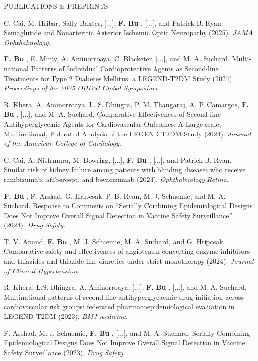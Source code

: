 \documentclass{resume} %
\newcommand{\thisYear}[1]{
	#1
}
\newcommand{\myName}[1]{
	\textbf{#1}
}
\begin{document}
\begin{rSection}{PUBLICATIONS \& PREPRINTS}
\smallskip 

C. Cai, M. Hribar, Sally Baxter, [...],  \myName{F. Bu}, [...], and Patrick B. Ryan. 
Semaglutide and Nonarteritic Anterior Ischemic Optic Neuropathy (2025). \emph{JAMA Ophthalmology}.  

\smallskip

\myName{F. Bu}, E. Minty, A. Aminorroaya, C. Blacketer, [...], and M. A. Suchard. 
Multi-national Patterns of Individual Cardioprotective Agents as Second-line Treatments for Type 2 Diabetes Mellitus: a LEGEND-T2DM Study (2024). \emph{Proceedings of the 2025 OHDSI Global Symposium.}

\thisYear{
R. Khera, A. Aminorroaya, L. S. Dhingra, P. M.  Thangaraj, A. P. Camargos, \myName{F. Bu}, [...], and M. A. Suchard. Comparative Effectiveness of Second-line Antihyperglycemic Agents for Cardiovascular Outcomes: A Large-scale, Multinational, Federated Analysis of the LEGEND-T2DM Study (2024). \emph{Journal of the American College of Cardiology}. 
}

\smallskip 

C. Cai, A. Nishimura, M. Bowring, [...], \myName{F. Bu}, [...], and Patrick B. Ryan. Similar risk of kidney failure among patients with blinding diseases who receive ranibizumab, aflibercept, and bevacizumab (2024). \emph{Ophthalmology Retina}.

\smallskip 

\myName{F. Bu}, F. Arshad, G. Hripcsak, P. B. Ryan, M. J. Schuemie, and M. A. Suchard. Response to Comments on ``Serially Combining Epidemiological Designs Does Not Improve Overall Signal Detection in Vaccine Safety Surveillance'' (2024). \emph{Drug Safety}. 

\smallskip 

T. V. Anand, \myName{F. Bu}, M. J. Schuemie, M. A. Suchard, and G. Hripcsak. Comparative safety and effectiveness of angiotensin converting enzyme inhibitors and thiazides and thiazide-like diuretics under strict monotherapy (2024).  \emph{Journal of Clinical Hypertension}.

\smallskip 

R. Khera, L.S. Dhingra, A. Aminorroaya, [...], \myName{F. Bu}, [...], and  M. A. Suchard.  Multinational patterns of second line antihyperglycaemic drug initiation across cardiovascular risk groups: federated pharmacoepidemiological evaluation in LEGEND-T2DM (2023). \emph{BMJ medicine}. 

\smallskip

F. Arshad, M. J. Schuemie, \myName{F. Bu}, [...], and M. A. Suchard. Serially Combining Epidemiological Designs Does Not Improve Overall Signal Detection in Vaccine Safety Surveillance (2023). \emph{Drug Safety}. 


\end{rSection}
\end{document}
